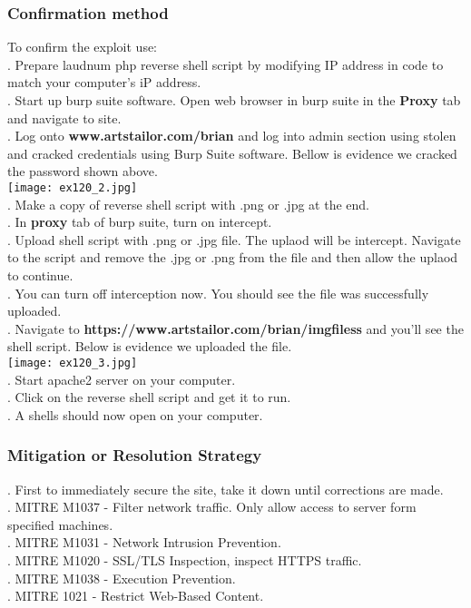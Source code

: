 \documentclass[notitlepage]{article}
\begin{document}
	\subsubsection{Confirmation method}
	To confirm the exploit use: \\
	. Prepare laudnum php reverse shell script by modifying IP address in code to match your computer's iP address.   \\
	. Start up burp suite software.  Open web browser in burp suite in the \textbf{Proxy} tab and navigate to site.   \\
	. Log onto \textbf{www.artstailor.com/brian} and log into admin section using stolen and cracked credentials using Burp Suite software.  Bellow is evidence we cracked the password shown above.  \\ 
	\texttt{[image: ex120\_2.jpg]} \\
	. Make a copy of reverse shell script with .png or .jpg at the end.\\
	. In \textbf{proxy} tab of burp suite, turn on intercept. \\
	. Upload shell script with .png or .jpg file.  The uplaod will be intercept.  Navigate to the script and remove the .jpg or .png from the file and then allow the uplaod to continue. \\
	. You can turn off interception now.  You should see the file was successfully uploaded. \\
	. Navigate to \textbf{https://www.artstailor.com/brian/imgfiless} and you'll see the shell script.  Below is evidence we uploaded the file. \\
	\texttt{[image: ex120\_3.jpg]} \\
	. Start apache2 server on your computer. \\
	. Click on the reverse shell script and get it to run.\\
	. A shells should now open on your computer.  \\
	
	\subsubsection{Mitigation or Resolution Strategy}
	. First to immediately secure the site, take it down until corrections are made. \\ 
	. MITRE M1037 - Filter network traffic. Only allow access to server form specified machines. \\
	. MITRE M1031 - Network Intrusion Prevention. \\
	. MITRE M1020 - SSL/TLS Inspection, inspect HTTPS traffic.\\
	. MITRE M1038 - Execution Prevention. \\
	. MITRE 1021 - Restrict Web-Based Content. \\
	
\end{document}
